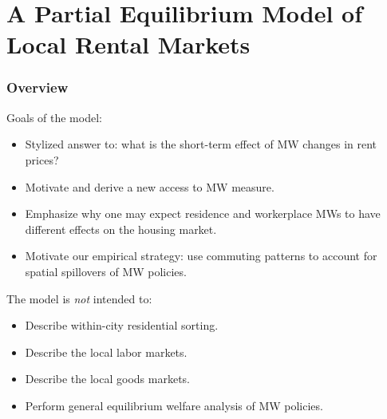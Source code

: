 \documentclass[aspectratio=169, t]{beamer}
\begin{document}
\section{A Partial Equilibrium Model of Local Rental Markets}

\begin{frame}
    \frametitle{Overview}
    
    Goals of the model:
	\begin{itemize}
		\item Stylized answer to: what is the short-term effect of MW changes in rent prices?
		\item Motivate and derive a new access to MW measure.
		\item Emphasize why one may expect residence and workerplace MWs to have different effects on the housing market.
		\item Motivate our empirical strategy: use commuting patterns to account for spatial
		spillovers of MW policies.
	\end{itemize}
	
	\pause
	\vspace{2mm}
	The model is \textit{not} intended to:
	\begin{itemize}
		\item Describe within-city residential sorting.
		\item Describe the local labor markets.
		\item Describe the local goods markets.
		\item Perform general equilibrium welfare analysis of MW policies.
	\end{itemize}
\end{frame}
\end{document}
